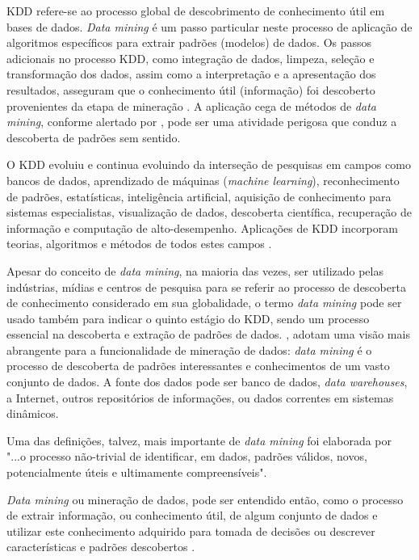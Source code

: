 KDD refere-se ao processo global de descobrimento de conhecimento útil em bases de dados. \textit{Data mining} é um passo particular neste processo de aplicação de algoritmos específicos para extrair padrões (modelos) de dados. Os passos adicionais no processo KDD, como integração de dados, limpeza, seleção e transformação dos dados, assim como a interpretação e a apresentação dos resultados, asseguram que o conhecimento útil (informação) foi descoberto provenientes da etapa de mineração \cite{han}. A aplicação cega de métodos de \textit{data mining}, conforme alertado por , pode ser uma atividade perigosa que conduz a descoberta de padrões sem sentido. 

O KDD evoluiu e continua evoluindo da interseção de pesquisas em campos como bancos de dados, aprendizado de máquinas (\textit{machine learning}), reconhecimento de padrões, estatísticas, inteligência artificial, aquisição de conhecimento para sistemas especialistas, visualização de dados, descoberta científica, recuperação de informação e computação de alto-desempenho. Aplicações de KDD incorporam teorias, algoritmos e métodos de todos estes campos \cite{credito-bancario}.

Apesar do conceito de \textit{data mining}, na maioria das vezes, ser utilizado pelas indústrias, mídias e centros de pesquisa para se referir ao processo de descoberta de conhecimento considerado em sua globalidade, o termo \textit{data mining} pode ser usado também para indicar o quinto estágio do KDD, sendo um processo essencial na descoberta e extração de padrões de dados. , adotam uma visão mais abrangente para a funcionalidade de mineração de dados: \textit{data mining} é o processo de descoberta de padrões interessantes e conhecimentos de um vasto conjunto de dados. A fonte dos dados pode ser banco de dados, \textit{data warehouses}, a Internet, outros repositórios de informações, ou dados correntes em sistemas dinâmicos.

Uma das definições, talvez, mais importante de \textit{data mining} foi elaborada por  "...o processo não-trivial de identificar, em dados, padrões válidos, novos, potencialmente úteis e ultimamente compreensíveis".

\textit{Data mining} ou mineração de dados, pode ser entendido então, como o processo de extrair informação, ou conhecimento útil, de algum conjunto de dados e utilizar este conhecimento adquirido para tomada de decisões ou descrever características e padrões descobertos \cite{conceito-data-mining}.

